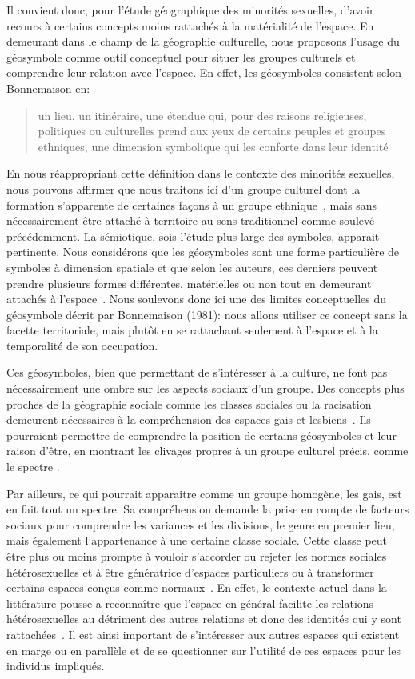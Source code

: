 Il convient donc, pour l'étude géographique des minorités sexuelles, d'avoir recours à certains concepts moins rattachés à la matérialité de l'espace. 
En demeurant dans le champ de la géographie culturelle, nous proposons l'usage du géosymbole comme outil conceptuel pour situer les groupes culturels et comprendre leur relation avec l'espace. 
En effet, les géosymboles consistent selon Bonnemaison en: \blockquote[{\cite[256]{Bonnemaison1981}}][.]{\textelp{} un lieu, un   itinéraire, une étendue qui, pour des raisons religieuses, politiques ou   culturelles prend aux yeux de certains peuples et groupes ethniques, une   dimension symbolique qui les conforte dans leur identité }. 
En nous réappropriant cette définition dans le contexte des minorités sexuelles, nous pouvons affirmer que nous traitons ici d'un groupe culturel dont la formation s'apparente de certaines façons à un groupe ethnique~\citep{Sinfield1996}, mais sans nécessairement être attaché à territoire au sens traditionnel comme soulevé précédemment. 
La sémiotique, sois l'étude plus large des symboles, apparait pertinente. 
Nous considérons que les géosymboles sont une forme particulière de symboles à dimension spatiale et que selon les auteurs, ces derniers peuvent prendre plusieurs formes différentes, matérielles ou non tout en demeurant attachés à l'espace~\citep{Bonnemaison1981,Bedard2002}. 
Nous soulevons donc ici une des limites conceptuelles du géosymbole décrit par Bonnemaison (1981): nous allons utiliser ce concept sans la facette territoriale, mais plutôt en se rattachant seulement à l'espace et à la temporalité de son occupation.

Ces géosymboles, bien que permettant de s'intéresser à la culture, ne font pas nécessairement une ombre sur les aspects sociaux d'un groupe. 
Des concepts plus proches de la géographie sociale comme les classes sociales ou la racisation~\citep{Bonniol2005} demeurent nécessaires à la compréhension des espaces gais et lesbiens~\citep[93]{Oswin2008}. 
Ils pourraient permettre de comprendre la position de certains géosymboles et leur raison d'être, en montrant les clivages propres à un groupe culturel précis, comme le spectre \lgbt{}.

Par ailleurs, ce qui pourrait apparaitre comme un groupe homogène, les gais, est en fait tout un spectre. 
Sa compréhension demande la prise en compte de facteurs sociaux pour comprendre les variances et les divisions, le genre en premier lieu, mais également l'appartenance à une certaine classe sociale.
Cette classe peut être plus ou moins prompte à vouloir s'accorder ou rejeter les normes sociales hétérosexuelles et à être génératrice d'espaces particuliers ou à transformer certains espaces conçus comme normaux~\citep{Lewis2011}. 
En effet, le contexte actuel dans la littérature pousse a reconnaître que l'espace en général facilite les relations hétérosexuelles au détriment des autres relations et donc des identités qui y sont rattachées~\citep{Brown2003}. 
Il est ainsi important de s'intéresser aux autres espaces qui existent en marge ou en parallèle et de se questionner sur l'utilité de ces espaces pour les individus impliqués.

